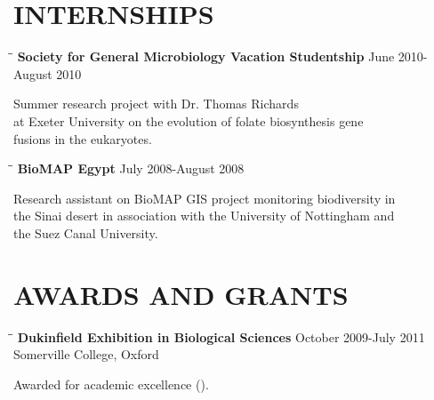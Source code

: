 \documentclass{res}
\begin{document}
\begin{resume}
\section{INTERNSHIPS}
   \vspace{-0.05in} 
   
    
      \begin{tabbing}
   \hspace{2in}\= \hspace{2.6in}\= \kill 
    {\bf Society for General Microbiology Vacation Studentship} \> \>        June 2010-August 2010\\
     \end{tabbing}\vspace{-20pt}      
Summer research project with Dr. Thomas Richards \\  at Exeter University on the evolution of folate biosynthesis gene \\fusions in the eukaryotes.

\vspace{-0.1in}
   \begin{tabbing}
   \hspace{2in}\= \hspace{2.6in}\= \kill 
    {\bf BioMAP Egypt} \> \>        July 2008-August 2008\\
     \end{tabbing}\vspace{-20pt}      
Research assistant on BioMAP GIS project monitoring biodiversity in \\the Sinai desert in association with the University of Nottingham and \\the Suez Canal University.



\section{AWARDS AND GRANTS}
   \vspace{-0.05in}  
   \begin{tabbing}
   \hspace{2in}\= \hspace{2.6in}\= \kill 
    {\bf Dukinfield Exhibition in Biological Sciences} \> \>        October 2009-July 2011\\
                                               
                                               \> \> Somerville College, Oxford \\
   \end{tabbing}\vspace{-30pt}     
   Awarded for academic excellence ().


\end{resume}
\end{document}
